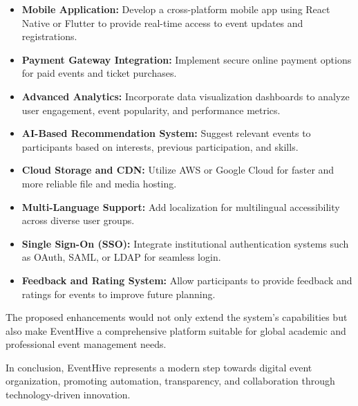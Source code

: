 \documentclass[12pt,a4paper]{report}
\begin{document}
\begin{itemize}
    \item \textbf{Mobile Application:} Develop a cross-platform mobile app using React Native or Flutter to provide real-time access to event updates and registrations.
    \item \textbf{Payment Gateway Integration:} Implement secure online payment options for paid events and ticket purchases.
    \item \textbf{Advanced Analytics:} Incorporate data visualization dashboards to analyze user engagement, event popularity, and performance metrics.
    \item \textbf{AI-Based Recommendation System:} Suggest relevant events to participants based on interests, previous participation, and skills.
    \item \textbf{Cloud Storage and CDN:} Utilize AWS or Google Cloud for faster and more reliable file and media hosting.
    \item \textbf{Multi-Language Support:} Add localization for multilingual accessibility across diverse user groups.
    \item \textbf{Single Sign-On (SSO):} Integrate institutional authentication systems such as OAuth, SAML, or LDAP for seamless login.
    \item \textbf{Feedback and Rating System:} Allow participants to provide feedback and ratings for events to improve future planning.
\end{itemize}

\noindent
The proposed enhancements would not only extend the system’s capabilities but also make EventHive a comprehensive platform suitable for global academic and professional event management needs.

\noindent
In conclusion, EventHive represents a modern step towards digital event organization, promoting automation, transparency, and collaboration through technology-driven innovation.

\renewcommand{\bibname}{References}
\end{document}
